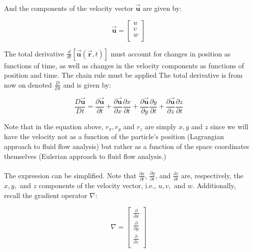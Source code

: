 \documentclass[11pt]{article}
\begin{document}
\noindent
And the components of the velocity vector $\vec{\bm{u}}$ are given by:

\begin{equation*}
    \vec{\bm{u}} = \begin{bmatrix}
                    u \\
                    v \\
                    w \\     
                    \end{bmatrix}
\end{equation*}

\noindent
The total derivative $\frac{d}{dt}[\vec{\bm{u}}(\vec{\bm{r}}, t)]$ must account for changes in position as functions of time, as well as changes in the velocity components as functions of position and time. The chain rule must be applied The total derivative is from now on denoted $\frac{D}{Dt}$ and is given by:

\begin{equation*}
    \frac{D\vec{\bm{u}}}{Dt} = \frac{\partial\vec{\bm{u}}}{\partial t} + \frac{\partial\vec{\bm{u}}}{\partial x}\frac{\partial x}{\partial t} + \frac{\partial\vec{\bm{u}}}{\partial y}\frac{\partial y}{\partial t} + \frac{\partial\vec{\bm{u}}}{\partial z}\frac{\partial z}{\partial t}
\end{equation*}

\noindent
Note that in the equation above, $r_x, r_y$ and $r_z$ are simply $x, y$ and $z$ since we will have the velocity not as a function of the particle's position (Lagrangian approach to fluid flow analysis) but rather as a function of the space coordinates themselves (Eulerian approach to fluid flow analysis.) \\ \\
\noindent
The expression can be simplified. Note that $\frac{\partial x}{\partial t}$, $\frac{\partial y}{\partial t}$, and $\frac{\partial z}{\partial t}$ are, respectively, the $x, y, $ and $z$ components of the velocity vector, i.e., $u, v,$ and $w$. Additionally, recall the gradient operator $\nabla$:

\begin{equation*}
    \nabla = \begin{bmatrix}
                \frac{\partial}{\partial x} \\
                \frac{\partial}{\partial y} \\
                \frac{\partial}{\partial z} \\     
                \end{bmatrix}
\end{equation*}
\end{document}
